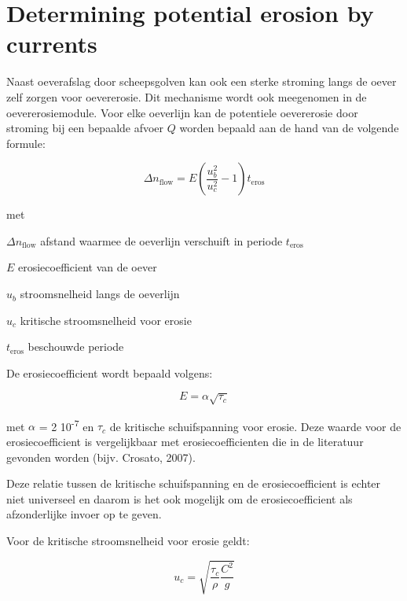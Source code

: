 \section{Determining potential erosion by currents} \label{Sec4.2}

Naast oeverafslag door scheepsgolven kan ook een sterke stroming langs de oever zelf zorgen voor oevererosie.
Dit mechanisme wordt ook meegenomen in de oevererosiemodule.
Voor elke oeverlijn kan de potentiele oevererosie door stroming bij een bepaalde afvoer $Q$ worden bepaald aan de hand van de volgende formule:

\begin{equation}
\Delta n_\text{flow} = E \left ( \frac{u_b^2}{u_c^2} - 1 \right ) t_\text{eros}
\end{equation}

met

\begin{symbollist}
\item[$\Delta n_\text{flow}$] afstand waarmee de oeverlijn verschuift in periode $t_\text{eros}$ 
\item[$E$] erosiecoefficient van de oever 
\item[$u_b$] stroomsnelheid langs de oeverlijn 
\item[$u_c$] kritische stroomsnelheid voor erosie 
\item[$t_\text{eros}$] beschouwde periode 
\end{symbollist}

De erosiecoefficient wordt bepaald volgens:

\begin{equation}
E = \alpha \sqrt{\tau_c}
\end{equation}

met $\alpha$ = 2 10\textsuperscript{-7}  en $\tau_c$  de kritische schuifspanning voor erosie.
Deze waarde voor de erosiecoefficient is vergelijkbaar met erosiecoefficienten die in de literatuur gevonden worden (bijv.
Crosato, 2007).

Deze relatie tussen de kritische schuifspanning en de erosiecoefficient is echter niet universeel en daarom is het ook mogelijk om de erosiecoefficient als afzonderlijke invoer op te geven.

Voor de kritische stroomsnelheid voor erosie geldt:

\begin{equation}
u_c = \sqrt{\frac{\tau_c}{\rho} \frac{C^2}{g}}
\end{equation}


